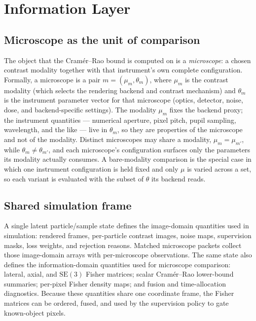 \section{Information Layer}
\label{sec:information-layer}
\label{sec:architecture}

\subsection{Microscope as the unit of comparison}
\label{subsec:microscope-unit}

The object that the Cram\'{e}r--Rao bound is computed on is a \emph{microscope}: a chosen contrast modality together with that instrument's own complete configuration. Formally, a microscope is a pair $m=(\mu_m,\theta_m)$, where $\mu_m$ is the contrast modality (which selects the rendering backend and contrast mechanism) and $\theta_m$ is the instrument parameter vector for that microscope (optics, detector, noise, dose, and backend-specific settings). The modality $\mu_m$ fixes the backend proxy; the instrument quantities --- numerical aperture, pixel pitch, pupil sampling, wavelength, and the like --- live in $\theta_m$, so they are properties of the microscope and not of the modality. Distinct microscopes may share a modality, $\mu_{m}=\mu_{m'}$, while $\theta_m\neq\theta_{m'}$, and each microscope's configuration surfaces only the parameters its modality actually consumes. A bare-modality comparison is the special case in which one instrument configuration is held fixed and only $\mu$ is varied across a set, so each variant is evaluated with the subset of $\theta$ its backend reads.

\subsection{Shared simulation frame}

A single latent particle/sample state defines the image-domain quantities used in simulation: rendered frames, per-particle contrast images, noise maps, supervision masks, loss weights, and rejection reasons. Matched microscope packets collect those image-domain arrays with per-microscope observations. The same state also defines the information-domain quantities used for microscope comparison: lateral, axial, and $\mathrm{SE}(3)$ Fisher matrices; scalar Cram\'{e}r--Rao lower-bound summaries; per-pixel Fisher density maps; and fusion and time-allocation diagnostics. Because these quantities share one coordinate frame, the Fisher matrices can be ordered, fused, and used by the supervision policy to gate known-object pixels.

